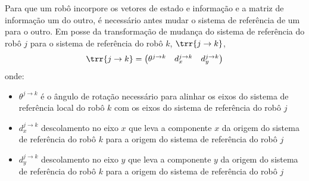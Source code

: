Para que um robô incorpore os vetores de estado e informação e a matriz 
de informação um do outro, é necessário antes mudar o sistema de 
referência de um para o outro. Em posse da transformação de mudança do 
sistema de referência do robô $j$ para o sistema de referência do robô 
$k$, $\trr{j\to k}$, 
\begin{equation}
  \trr{j \to k} = \begin{pmatrix}
    \theta^{j\to k} & d_x^{j\to k} & d_y^{j\to k}
  \end{pmatrix}
\end{equation}
onde:
\begin{itemize}
  \item $\theta^{j\to k}$ é o ângulo de rotação necessário para alinhar 
os eixos do sistema de referência local do robô $k$ com os eixos do 
sistema de referência do robô $j$
  \item $d_x^{j\to k}$ descolamento no eixo $x$ que leva a componente $x$ 
da origem do sistema de referência do robô $k$ para a origem do 
sistema de referência do robô $j$
  \item $d_y^{j\to k}$ descolamento no eixo $y$ que leva a componente $y$ 
da origem do sistema de referência do robô $k$ para a origem do 
sistema de referência do robô $j$
\end{itemize}

